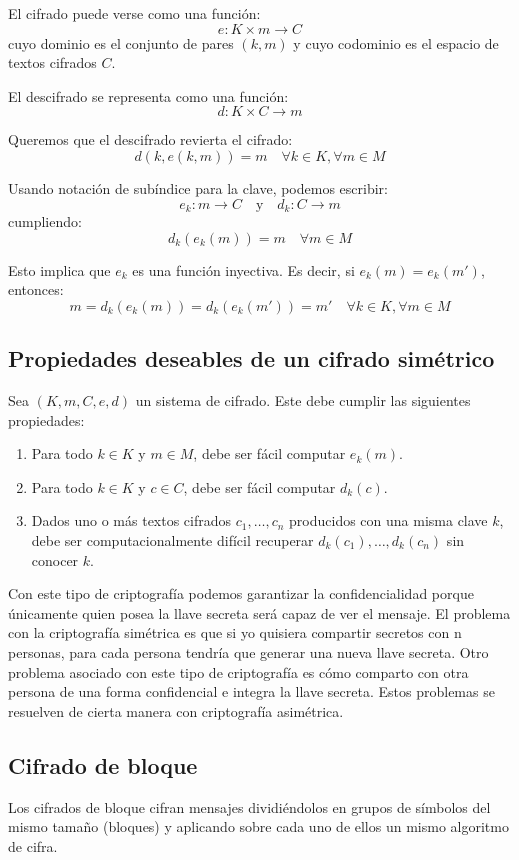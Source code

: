 El cifrado puede verse como una función:
\[
e : K \times m \rightarrow C
\]
cuyo dominio es el conjunto de pares $(k, m)$ y cuyo codominio es el espacio de textos cifrados $C$.

El descifrado se representa como una función:
\[
d : K \times C \rightarrow m
\]

Queremos que el descifrado revierta el cifrado:
\[
d(k, e(k, m)) = m \quad \forall k \in K, \forall m \in M
\]

Usando notación de subíndice para la clave, podemos escribir:
\[
e_k : m \rightarrow C \quad \text{y} \quad d_k : C \rightarrow m
\]
cumpliendo:
\[
d_k(e_k(m)) = m \quad \forall m \in M
\]

Esto implica que $e_k$ es una función inyectiva. Es decir, si $e_k(m) = e_k(m')$, entonces:
\[
m = d_k(e_k(m)) = d_k(e_k(m')) = m' \quad \forall k \in K, \forall m \in M
\]

\subsection*{Propiedades deseables de un cifrado simétrico}

Sea $(K, m, C, e, d)$ un sistema de cifrado. Este debe cumplir las siguientes propiedades:

\begin{enumerate}
    \item Para todo $k \in K$ y $m \in M$, debe ser fácil computar $e_k(m)$.
    \item Para todo $k \in K$ y $c \in C$, debe ser fácil computar $d_k(c)$.
    \item Dados uno o más textos cifrados $c_1, \ldots, c_n$ producidos con una misma clave $k$, debe ser computacionalmente difícil recuperar $d_k(c_1), \ldots, d_k(c_n)$ sin conocer $k$.
\end{enumerate}

Con este tipo de criptografía podemos garantizar la confidencialidad porque únicamente quien posea la llave secreta será capaz de ver el mensaje.
El problema con la criptografía simétrica es que si yo quisiera compartir secretos con n personas, para cada persona tendría que generar una nueva llave secreta.
Otro problema asociado con este tipo de criptografía es cómo comparto con otra persona de una forma confidencial e integra la llave secreta.
Estos problemas se resuelven de cierta manera con criptografía asimétrica.

\subsection{Cifrado de bloque}
Los cifrados de bloque cifran mensajes dividiéndolos en grupos de símbolos del mismo tamaño (bloques) y aplicando sobre cada uno de ellos un mismo algoritmo de cifra.

